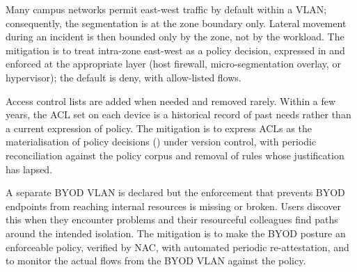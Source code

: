 \begin{pitfallbox}
\noindent Many campus networks permit east-west traffic by default
within a VLAN; consequently, the segmentation is at the zone
boundary only. Lateral movement during an incident is then bounded
only by the zone, not by the workload. The mitigation is to treat
intra-zone east-west as a policy decision, expressed in
 and enforced at the appropriate layer (host
firewall, micro-segmentation overlay, or hypervisor); the default is
deny, with allow-listed flows.
\end{pitfallbox}

\begin{pitfallbox}
\noindent Access control lists are added when needed and removed
rarely. Within a few years, the ACL set on each device is a
historical record of past needs rather than a current expression of
policy. The mitigation is to express ACLs as the materialisation of
policy decisions () under version control, with
periodic reconciliation against the policy corpus and removal of
rules whose justification has lapsed.
\end{pitfallbox}

\begin{pitfallbox}
\noindent A separate BYOD VLAN is declared but the enforcement that
prevents BYOD endpoints from reaching internal resources is missing
or broken. Users discover this when they encounter problems and
their resourceful colleagues find paths around the intended
isolation. The mitigation is to make the BYOD posture an enforceable
policy, verified by NAC, with automated periodic re-attestation, and
to monitor the actual flows from the BYOD VLAN against the policy.
\end{pitfallbox}
